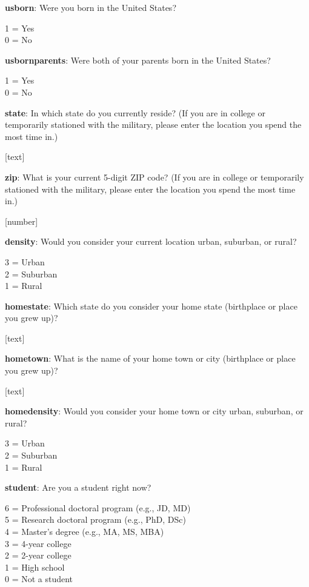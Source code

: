 \documentclass[11pt, headsepline]{article}
\begin{document}

\textbf{usborn}: Were you born in the United States?

1 = Yes \\
0 = No

\textbf{usbornparents}: Were both of your parents born in the United States?

1 = Yes \\
0 = No

\textbf{state}: In which state do you currently reside? (If you are in college or temporarily stationed with the military, please enter the location you spend the most time in.)

[text]

\textbf{zip}: What is your current 5-digit ZIP code? (If you are in college or temporarily stationed with the military, please enter the location you spend the most time in.)

[number]

\textbf{density}: Would you consider your current location urban, suburban, or rural?

3 = Urban \\
2 = Suburban \\
1 = Rural

\textbf{homestate}: Which state do you consider your home state (birthplace or place you grew up)?

[text]

\textbf{hometown}: What is the name of your home town or city (birthplace or place you grew up)?

[text]

\textbf{homedensity}: Would you consider your home town or city urban, suburban, or rural?

3 = Urban \\
2 = Suburban \\
1 = Rural

\textbf{student}: Are you a student right now?

6 = Professional doctoral program (e.g., JD, MD) \\
5 = Research doctoral program (e.g., PhD, DSc) \\
4 = Master’s degree (e.g., MA, MS, MBA) \\ 
3 = 4-year college \\ 
2 = 2-year college \\
1 = High school \\ 
0 = Not a student
\end{document}
